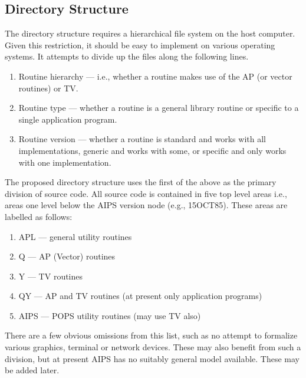 \subsection{Directory Structure}
The directory structure requires a hierarchical file system on the
host computer. Given this restriction, it should be easy to implement
on various operating systems.  It attempts to divide up the files
along the following lines.
\begin{enumerate} %
\item Routine hierarchy --- i.e., whether a routine makes use of the AP
(or vector routines) or TV.
\item Routine type --- whether a routine is a general library routine or
specific to a single application program.
\item Routine version --- whether a routine is standard and works with all
implementations, generic and works with some, or specific and only
works with one implementation.
\end{enumerate} %
The proposed directory structure uses the first of the above as the
primary division of source code. All source code is contained in five
top level areas i.e., areas one level below the AIPS version node
(e.g., 15OCT85). These areas are labelled as follows:
\begin{enumerate} %
\item APL --- general utility routines
\item Q --- AP (Vector) routines
\item Y --- TV routines
\item QY --- AP and TV routines (at present only application programs)
\item AIPS --- POPS utility routines (may use TV also)
\end{enumerate} %
There are a few obvious omissions from this list, such as no attempt
to formalize various graphics, terminal or network devices. These may
also benefit from such a division, but at present AIPS has no
suitably general model available. These may be added later.

